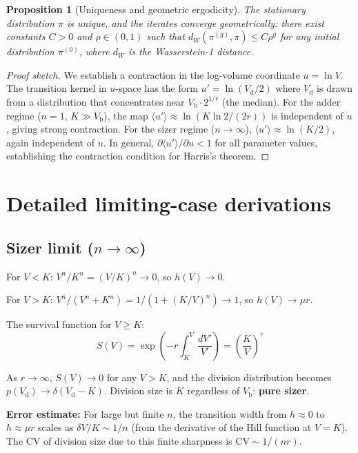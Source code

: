 \documentclass[11pt]{article}
\newtheorem{proposition}{Proposition}
\newcommand{\Vb}{V_{\mathrm{b}}}
\newcommand{\Vd}{V_{\mathrm{d}}}
\begin{document}
\begin{proposition}[Uniqueness and geometric ergodicity]
The stationary distribution $\pi$ is unique, and the iterates
converge geometrically: there exist constants $C > 0$ and
$\rho \in (0,1)$ such that
$d_W(\pi^{(g)}, \pi) \leq C \rho^g$ for any initial distribution
$\pi^{(0)}$, where $d_W$ is the Wasserstein-1 distance.
\end{proposition}

\begin{proof}[Proof sketch]
We establish a contraction in the log-volume coordinate
$u = \ln V$.  The transition kernel in $u$-space has the form
$u' = \ln(\Vd/2)$ where $\Vd$ is drawn from a distribution that
concentrates near $\Vb \cdot 2^{1/r}$ (the median).  For the
adder regime ($n=1$, $K \gg \Vb$), the map $\langle u' \rangle
\approx \ln(K \ln 2 / (2r))$ is independent of $u$, giving strong
contraction.  For the sizer regime ($n \to \infty$), $\langle u'
\rangle \approx \ln(K/2)$, again independent of $u$.  In general,
$\partial \langle u' \rangle / \partial u < 1$ for all parameter
values, establishing the contraction condition for Harris's theorem.
\end{proof}

\section{Detailed limiting-case derivations}

\subsection{Sizer limit ($n \to \infty$)}

For $V < K$: $V^n/K^n = (V/K)^n \to 0$, so $h(V) \to 0$.

For $V > K$: $V^n/(V^n + K^n) = 1/(1 + (K/V)^n) \to 1$, so
$h(V) \to \mu r$.

The survival function for $V \geq K$:
\begin{equation}
  S(V) = \exp\left(-r \int_K^V \frac{dV'}{V'}\right)
       = \left(\frac{K}{V}\right)^r
\end{equation}

As $r \to \infty$, $S(V) \to 0$ for any $V > K$, and the division
distribution becomes $p(\Vd) \to \delta(\Vd - K)$.  Division size is
$K$ regardless of $\Vb$: \textbf{pure sizer}.

\textbf{Error estimate:} For large but finite $n$, the transition
width from $h \approx 0$ to $h \approx \mu r$ scales as
$\delta V / K \sim 1/n$ (from the derivative of the Hill function at
$V = K$).  The CV of division size due to this finite sharpness is
$\mathrm{CV} \sim 1/(nr)$.
\end{document}
